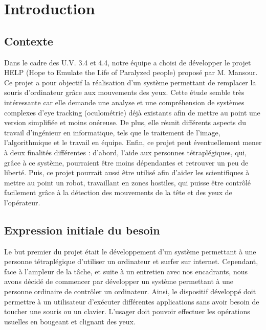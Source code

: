 \section*{Introduction}

\subsection*{Contexte}

Dans le cadre des U.V. 3.4 et 4.4, notre équipe a choisi de développer le projet HELP (Hope to Emulate the Life of Paralyzed people) proposé par M. Mansour. Ce projet a pour objectif la réalisation d'un système permettant de remplacer la souris d’ordinateur grâce aux mouvements des yeux. Cette étude semble très intéressante car elle demande une analyse et une compréhension de systèmes complexes d'eye tracking (oculométrie) déjà existants afin de mettre au point une version simplifiée et moins onéreuse. De plus, elle réunit différents aspects du travail d'ingénieur en informatique, tels que le traitement de l'image, l'algorithmique et le travail en équipe. Enfin, ce projet peut éventuellement mener à deux finalités différentes : d'abord, l'aide aux personnes tétraplégiques, qui, grâce à ce système, pourraient être moins dépendantes et retrouver un peu de liberté. Puis, ce projet pourrait aussi être utilisé afin d'aider les scientifiques à mettre au point un robot, travaillant en zones hostiles, qui puisse être contrôlé facilement grâce à la détection des mouvements de la tête et des yeux de l'opérateur.

\subsection*{Expression initiale du besoin}

Le but premier du projet était le développement d'un système permettant à une personne tétraplégique d'utiliser un ordinateur et surfer sur internet. Cependant, face à l'ampleur de la tâche, et suite à un entretien avec nos encadrants, nous avons décidé de commencer par développer un système permettant à une personne ordinaire de contrôler un ordinateur. Ainsi, le dispositif développé doit permettre à un utilisateur d'exécuter différentes applications sans avoir besoin de toucher une souris ou un clavier. L'usager doit pouvoir effectuer les opérations usuelles en bougeant et clignant des yeux.
